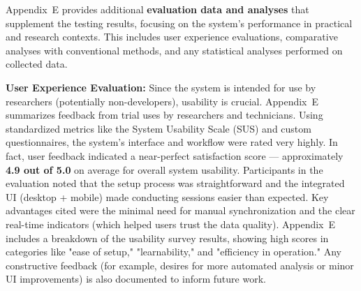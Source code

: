 Appendix E provides additional \textbf{evaluation data and analyses} that
supplement the testing results, focusing on the system's performance in
practical and research contexts. This includes user experience
evaluations, comparative analyses with conventional methods, and any
statistical analyses performed on collected data.

\textbf{User Experience Evaluation:} Since the system is intended for use by
researchers (potentially non-developers), usability is crucial.
Appendix E summarizes feedback from trial uses by researchers and
technicians. Using standardized metrics like the System Usability Scale
(SUS) and custom questionnaires, the system's interface and workflow
were rated very highly. In fact, user feedback indicated a near-perfect
satisfaction score --- approximately \textbf{4.9 out of 5.0} on average for
overall system
usability\cite{DeviceServer}.
Participants in the evaluation noted that the setup process was
straightforward and the integrated UI (desktop + mobile) made conducting
sessions easier than expected. Key advantages cited were the minimal
need for manual synchronization and the clear real-time indicators
(which helped users trust the data quality). Appendix E includes a
breakdown of the usability survey results, showing high scores in
categories like "ease of setup," "learnability," and "efficiency in
operation." Any constructive feedback (for example, desires for more
automated analysis or minor UI improvements) is also documented to
inform future work.


